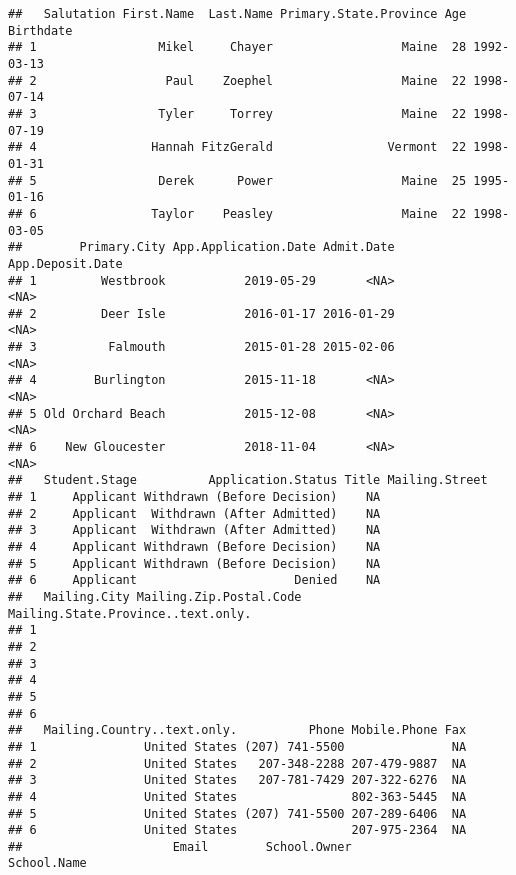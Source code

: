 \documentclass[]{article}
\begin{document}
\begin{verbatim}
##   Salutation First.Name  Last.Name Primary.State.Province Age  Birthdate
## 1                 Mikel     Chayer                  Maine  28 1992-03-13
## 2                  Paul    Zoephel                  Maine  22 1998-07-14
## 3                 Tyler     Torrey                  Maine  22 1998-07-19
## 4                Hannah FitzGerald                Vermont  22 1998-01-31
## 5                 Derek      Power                  Maine  25 1995-01-16
## 6                Taylor    Peasley                  Maine  22 1998-03-05
##        Primary.City App.Application.Date Admit.Date App.Deposit.Date
## 1         Westbrook           2019-05-29       <NA>             <NA>
## 2         Deer Isle           2016-01-17 2016-01-29             <NA>
## 3          Falmouth           2015-01-28 2015-02-06             <NA>
## 4        Burlington           2015-11-18       <NA>             <NA>
## 5 Old Orchard Beach           2015-12-08       <NA>             <NA>
## 6    New Gloucester           2018-11-04       <NA>             <NA>
##   Student.Stage          Application.Status Title Mailing.Street
## 1     Applicant Withdrawn (Before Decision)    NA               
## 2     Applicant  Withdrawn (After Admitted)    NA               
## 3     Applicant  Withdrawn (After Admitted)    NA               
## 4     Applicant Withdrawn (Before Decision)    NA               
## 5     Applicant Withdrawn (Before Decision)    NA               
## 6     Applicant                      Denied    NA               
##   Mailing.City Mailing.Zip.Postal.Code Mailing.State.Province..text.only.
## 1                                                                        
## 2                                                                        
## 3                                                                        
## 4                                                                        
## 5                                                                        
## 6                                                                        
##   Mailing.Country..text.only.          Phone Mobile.Phone Fax
## 1               United States (207) 741-5500               NA
## 2               United States   207-348-2288 207-479-9887  NA
## 3               United States   207-781-7429 207-322-6276  NA
## 4               United States                802-363-5445  NA
## 5               United States (207) 741-5500 207-289-6406  NA
## 6               United States                207-975-2364  NA
##                     Email        School.Owner                 School.Name

\end{verbatim}
\end{document}
